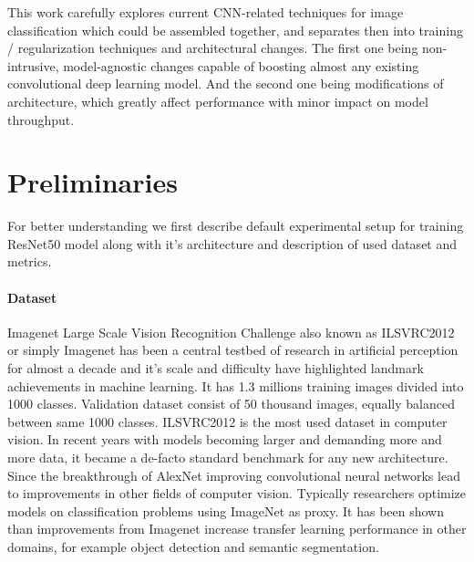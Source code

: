 
This work carefully explores current CNN-related techniques for image classification which could be assembled together, and separates then into training / regularization techniques and architectural changes. The first one being non-intrusive, model-agnostic changes capable of boosting almost any existing convolutional deep learning model. And the second one being modifications of architecture, which greatly affect performance with minor impact on model throughput. 



\section{Preliminaries} \label{sec: preliminaries}
For better understanding we first describe default experimental setup for training ResNet50 model along with it's architecture and description of used dataset and metrics. 

\paragraph{Dataset} \label{subsec: imagenet}


Imagenet Large Scale Vision Recognition Challenge also known as ILSVRC2012 or simply Imagenet has been a central testbed of research in artificial perception for almost a decade and it's scale and difficulty have highlighted landmark achievements in machine learning. It has 1.3 millions training images divided into 1000 classes. Validation dataset consist of 50 thousand images, equally balanced between same 1000 classes. ILSVRC2012 is the most used dataset in computer vision. %
In recent years with models becoming larger and demanding more and more data, it became a de-facto standard benchmark for any new architecture. Since the breakthrough of AlexNet improving convolutional neural networks lead to improvements in other fields of computer vision. Typically researchers optimize models on classification problems using ImageNet \cite{deng2009_imagenet} as proxy. It has been shown \cite{he2019_bag_of_tricks} \cite{kornblith2019_better} than improvements from Imagenet increase transfer learning performance in other domains, for example object detection and semantic segmentation.


